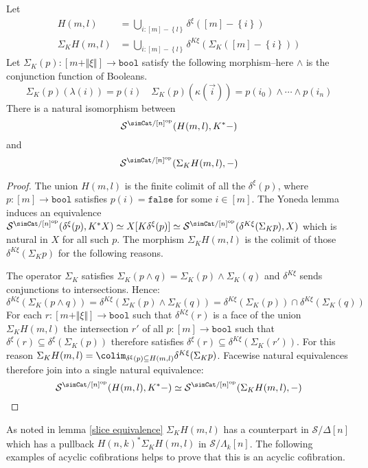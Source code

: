 \documentclass{tac}
\newcommand\cat\mathcal
\newcommand\set[1]{\left\{#1\right\}}
\newcommand\ri{^*}
\newcommand\dual{^{\mathrm{op}}}
\newcommand\of{:}
\newcommand\simplex\Delta
\newcommand\horn\Lambda
\newcommand\false{\mathtt{false}}
\newcommand\bool{\mathtt{bool}}
\newcommand\norm[1]{\Vert #1 \Vert}
\newcommand\ka\kappa
\newcommand\la\lambda
\newcommand\depsum{\Sigma_}
\newcommand\face\delta
\begin{document}
\begin{proposition} Let
\begin{align*}
H(m,l)&=\bigcup_{i\of [m]-\set l} \face^\xi([m]-\set i)\\
\depsum KH(m,l)&=\bigcup_{i\of [m]-\set l} \face^{K\xi}(\depsum K([m]-\set i))
\end{align*}
Let $\depsum K(p)\of [m+\norm\xi]\to \bool$ satisfy the following morphism--here $\mathord\land$ is the conjunction function of Booleans.
\[ \depsum K(p)(\la(i))=p(i)\quad\depsum K(p)(\ka(\vec i)) = p(i_0)\land\dotsm\land p(i_n) \] 
There is a natural isomorphism between
\[ \cat S^{\simCat/[n]\dual}(H(m,l),K\ri -) \] and 
\[ \cat S^{\simCat/[n]\dual}(\depsum KH(m,l),-) \] \label{K-universal}
\end{proposition}


\begin{proof} The union $H(m,l)$ is the finite colimit of all the $\face^\xi(p)$, where $p\of[m]\to\bool$ satisfies $p(i)=\false$ for some $i\in [m]$. The Yoneda lemma induces an equivalence $\cat S^{\simCat/[n]\dual}(\face^\xi(p),K\ri X)\simeq X[K\face^\xi(p)]\simeq \cat S^{\simCat/[n]\dual}(\face^{K\xi}(\depsum K p),X)$ which is natural in $X$ for all such $p$. The morphism $\depsum KH(m,l)$ is the colimit of those $\face^{K\xi}(\depsum K p)$ for the following reasons.

The operator $\depsum K$ satisfies $\depsum K(p\land q)=\depsum K(p)\land \depsum K(q)$ and $\face^{K\xi}$ sends conjunctions to intersections. Hence:
\[ \face^{K\xi}(\depsum K(p\land q)) = \face^{K\xi}(\depsum K(p)\land \depsum K(q)) = \face^{K\xi}(\depsum K(p))\cap \face^{K\xi}(\depsum K(q)) \]
For each $r\of[m+\norm\xi]\to \bool$ such that $\face^{K\xi}(r)$ is a face of the union $\depsum KH(m,l)$ the intersection $r'$ of all $p\of[m]\to \bool$ such that $\face^\xi(r)\subseteq\face^\xi(\depsum K(p))$ therefore satisfies $\face^\xi(r)\subseteq \face^{K\xi}(\depsum K(r'))$. For this reason $\depsum KH(m,l)=\colim_{\face^\xi(p)\subseteq H(m,l)}\face^{K\xi}(\depsum K p)$. Facewise natural equivalences therefore join into a single natural equivalence:
\[ \cat S^{\simCat/[n]\dual}(H(m,l),K\ri -)\simeq\cat S^{\simCat/[n]\dual}(\depsum K H(m,l), -) \]
\end{proof}

As noted in lemma \ref{slice equivalence} $\depsum K H(m,l)$ has a counterpart in $\cat S/\simplex[n]$ which has a pullback $H(n,k)\ri \depsum K H(m,l)$ in $\cat S/\horn_k[n]$. The following examples of acyclic cofibrations helps to prove that this is an acyclic cofibration.
\end{document}
